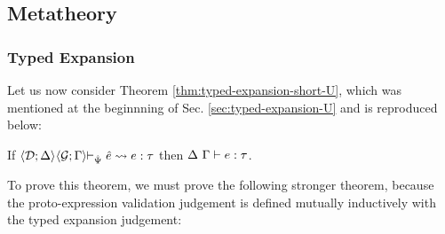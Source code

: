 

\subsection{Metatheory}\label{sec:SE-metatheory}
\subsubsection{Typed Expansion}
Let us now consider Theorem \ref{thm:typed-expansion-short-U}, which was mentioned at the beginnning of Sec. \ref{sec:typed-expansion-U} and is reproduced below:
\begingroup
\def\thetheorem{\ref{thm:typed-expansion-short-U}}
\begin{theorem} \hspace{-3px}If $\expandsU{\uDD{\uD}{\Delta}\hspace{-3px}}{\uGG{\uG}{\Gamma}\hspace{-3px}}{\uPsi}{\ue}{e}{\tau}$ then $\Delta~\Gamma \vdash e : \tau$.
\end{theorem}
\endgroup

 To prove this theorem, we must  prove the following stronger theorem, because the proto-expression validation judgement is defined mutually inductively with the typed expansion judgement:

